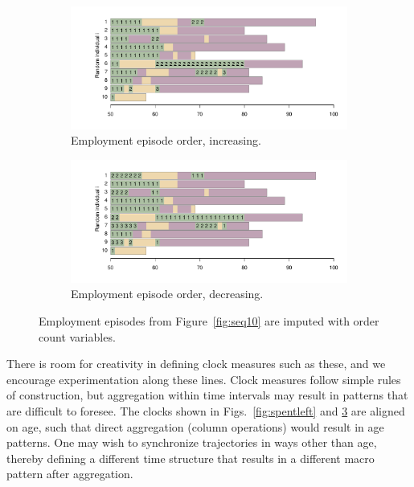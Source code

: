 \documentclass[a4paper,left=1.25cm,right=1.25cm,top=1.25cm,bottom=1.25cm]{article}
\begin{document}
\begin{figure}[ht!]
\centering

\begin{subfigure}{\textwidth}
\includegraphics[scale=.5]{Figures/Seq10ordUp.pdf}
\caption{Employment episode order, increasing.}
\label{fig:orderup}
\end{subfigure}

\begin{subfigure}{\textwidth}
\includegraphics[scale=.5]{Figures/Seq10ordDown.pdf}
\caption{Employment episode order, decreasing.}
\label{fig:orderdown}
\end{subfigure}

\caption{Employment episodes from Figure~\ref{fig:seq10}
are imputed with order count variables.}
\label{fig:order}
\end{figure}

There is room for creativity in defining clock measures such as these, and we encourage experimentation along these lines. Clock measures follow simple rules of construction, but aggregation within time intervals may result in patterns that are difficult to foresee. The clocks shown in Figs.~\ref{fig:spentleft} and \ref{fig:order} are aligned on age, such that direct aggregation (column operations) would result in age patterns.  One may wish to synchronize trajectories in ways other than age, thereby defining a different time structure that results in a different macro pattern after aggregation.
\end{document}
